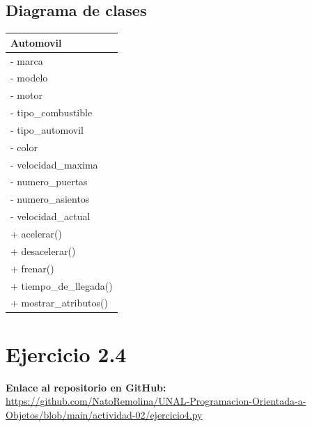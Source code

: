 \documentclass[11pt, a4paper]{article}
\newcommand{\clasebox}[3]{%
\begin{center}
\begin{tabular}{|l|}
\hline
\textbf{#1} \\
\hline
#2
\hline
#3
\hline
\end{tabular}
\end{center}
}
\begin{document}
\subsection{Diagrama de clases}
\clasebox{Automovil}
{%
- marca \\
- modelo \\
- motor \\
- tipo\_combustible \\
- tipo\_automovil \\
- color \\
- velocidad\_maxima \\
- numero\_puertas \\
- numero\_asientos \\
- velocidad\_actual \\
}
{%
+ acelerar() \\
+ desacelerar() \\
+ frenar() \\
+ tiempo\_de\_llegada() \\
+ mostrar\_atributos() \\
}

\newpage
\section{Ejercicio 2.4}

\noindent \textbf{Enlace al repositorio en GitHub:} \\
\url{https://github.com/NatoRemolina/UNAL-Programacion-Orientada-a-Objetos/blob/main/actividad-02/ejercicio4.py}
\end{document}
